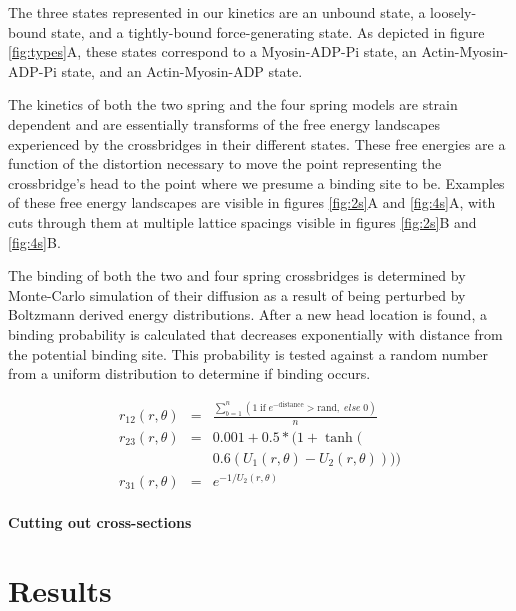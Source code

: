 \documentclass[]{article}
\begin{document}
The three states represented in our kinetics are an unbound state, a loosely-bound state, and a tightly-bound force-generating state.
As depicted in figure \ref{fig:types}A, these states correspond to a Myosin-ADP-Pi state, an Actin-Myosin-ADP-Pi state, and an Actin-Myosin-ADP state.

The kinetics of both the two spring and the four spring models are strain dependent and are essentially transforms of the free energy landscapes experienced by the crossbridges in their different states.
These free energies are a function of the distortion necessary to move the point representing the crossbridge's head to the point where we presume a binding site to be.
Examples of these free energy landscapes are visible in figures \ref{fig:2s}A and \ref{fig:4s}A, with cuts through them at multiple lattice spacings visible in figures \ref{fig:2s}B and \ref{fig:4s}B.

The binding of both the two and four spring crossbridges is determined by Monte-Carlo simulation of their diffusion as a result of being perturbed by Boltzmann derived energy distributions. 
After a new head location is found, a binding probability is calculated that decreases exponentially with distance from the potential binding site. 
This probability is tested against a random number from a uniform distribution to determine if binding occurs.



\begin{eqnarray}  
\label{eq:KineticRates}
	r_{12}(r, \theta)   & = & \frac{\sum_{b=1}^n (1\; \textrm{if}\; e^{-\textrm{distance}}>\textrm{rand} ,\; else\; 0)}{n}  \nonumber \\
    r_{23}(r, \theta)   & = & 0.001 + 0.5 * (1 + \tanh( \nonumber \\
                        &   & 0.6 (U_1(r, \theta) - U_2(r, \theta)))) \\
	r_{31}(r, \theta)   & = & e^{-1 / U_2(r, \theta)}
\end{eqnarray} 


\paragraph*{Cutting out cross-sections}




\section*{Results} %
\label{sec:results}
\end{document}
